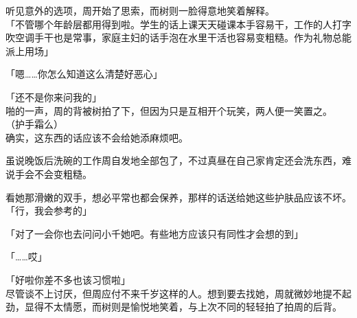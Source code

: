 听见意外的选项，周开始了思索，而树则一脸得意地笑着解释。\\

「不管哪个年龄层都用得到啦。学生的话上课天天碰课本手容易干，工作的人打字吹空调手干也是常事，家庭主妇的话手泡在水里干活也容易变粗糙。作为礼物总能派上用场」

「嗯……你怎么知道这么清楚好恶心」

「还不是你来问我的」\\

啪的一声，周的背被树拍了下，但因为只是互相开个玩笑，两人便一笑置之。\\

（护手霜么）\\

确实，这东西的话应该不会给她添麻烦吧。

虽说晚饭后洗碗的工作周自发地全部包了，不过真昼在自己家肯定还会洗东西，难说手会不会变粗糙。

看她那滑嫩的双手，想必平常也都会保养，那样的话送给她这些护肤品应该不坏。\\

「行，我会参考的」

「对了一会你也去问问小千她吧。有些地方应该只有同性才会想的到」

「……哎」

「好啦你差不多也该习惯啦」\\

尽管谈不上讨厌，但周应付不来千岁这样的人。想到要去找她，周就微妙地提不起劲，显得不太情愿，而树则是愉悦地笑着，与上次不同的轻轻拍了拍周的后背。%

